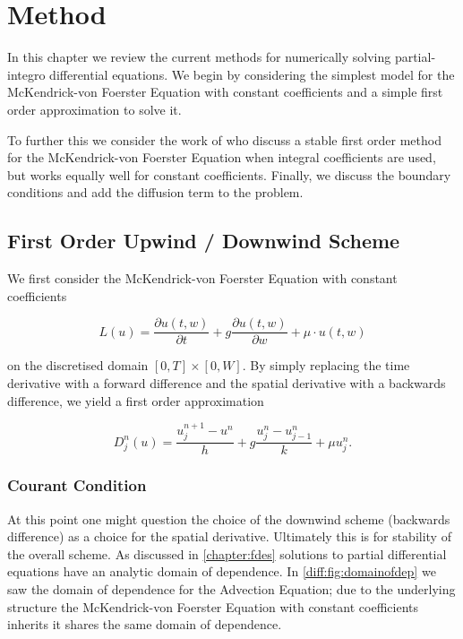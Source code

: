 \documentclass[../main.tex]{subfiles}
\begin{document}
  \chapter{Method}\label{chapter:method}

  In this chapter we review the current methods for numerically solving partial-integro differential equations. We begin by considering the simplest model for the McKendrick-von Foerster Equation with constant coefficients and a simple first order approximation to solve it.

  To further this we consider the work of \cite{hartvig2011} who discuss a stable first order method for the McKendrick-von Foerster Equation when integral coefficients are used, but works equally well for constant coefficients. Finally, we discuss the boundary conditions and add the diffusion term to the problem.

  \section{First Order Upwind / Downwind Scheme}
  We first consider the McKendrick-von Foerster Equation with constant coefficients

  \begin{equation}
    L(u) = \frac{\partial u(t, w)}{\partial t} + g \frac{\partial u(t, w)}{\partial w} + \mu \cdot u(t, w)
  \end{equation}

  on the discretised domain $[0, T] \times [0, W]$. By simply replacing the time derivative with a forward difference and the spatial derivative with a backwards difference, we yield a first order approximation

  \begin{equation}
    D^n_j(u) = \frac{u^{n+1}_j - u^n}{h} + g \frac{u^n_{j} - u^n_{j-1}}{k} + \mu u^n_j.
  \end{equation}

  \subsection{Courant Condition} \label{method:sec:courant}
  At this point one might question the choice of the downwind scheme (backwards difference) as a choice for the spatial derivative. Ultimately this is for stability of the overall scheme. As discussed in \autoref{chapter:fdes} solutions to partial differential equations have an analytic domain of dependence. In \autoref{diff:fig:domainofdep} we saw the domain of dependence for the Advection Equation; due to the underlying structure the McKendrick-von Foerster Equation with constant coefficients inherits it shares the same domain of dependence.
\end{document}
